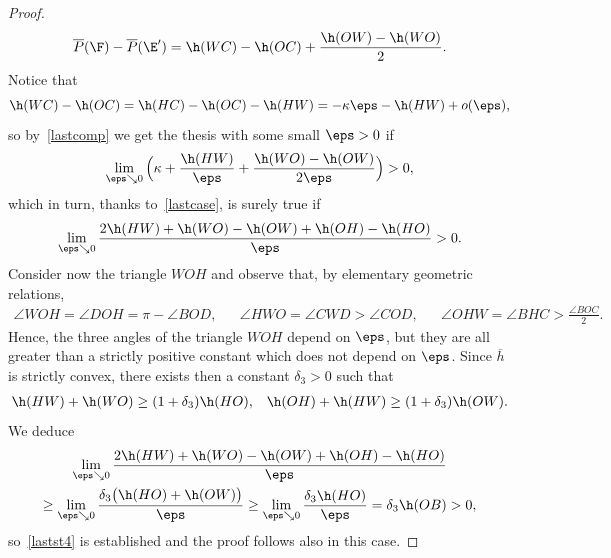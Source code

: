 \begin{proof}
\begin{equation}
\overline P(\F)-\overline P(\E')= \h(WC)-\h(OC) + \frac{\h(OW)-\h(WO)}2.
\end{equation}
Notice that
\[
\h(WC)-\h(OC) = \h(HC)-\h(OC)-\h(HW) = -\kappa \eps - \h(HW) +o(\eps),
\]
so by~\eqref{lastcomp} we get the thesis with some small $\eps>0$ if
\[
\lim_{\eps\searrow 0}\, \Bigl(\kappa+\frac{\h(HW)}\eps + \frac{\h(WO)-\h(OW)}{2\eps}\Bigr)>0,
\]
which in turn, thanks to~\eqref{lastcase}, is surely true if
\begin{equation}\label{lastst4}
\lim_{\eps\searrow 0} \frac{2\h(HW) + \h(WO)-\h(OW) + \h(OH)-\h(HO)}\eps>0.
\end{equation}
Consider now the triangle $WOH$ and observe that, by elementary geometric relations,
\begin{align*}
\angle WOH= \angle DOH = \pi - \angle BOD , &&
\angle HWO =\angle CWD > \angle COD , &&
\angle OHW = \angle BHC > \frac{\angle BOC}2 .
\end{align*}
Hence, the three angles of the triangle $WOH$ depend on $\eps$, but they are all greater than a strictly positive constant which does not depend on $\eps$. Since $\overline h$ is strictly convex, there exists then a constant $\delta_3>0$ such that
\begin{align*}
\h(HW)+\h(WO) \geq (1+\delta_3) \h(HO), && \h(OH)+ \h(HW)\geq (1+\delta_3)\h(OW).
\end{align*}
We deduce
\begin{multline*}
\lim_{\eps\searrow 0} \frac{2\h(HW) + \h(WO)-\h(OW) + \h(OH)-\h(HO)}\eps\\
\geq \lim_{\eps\searrow 0} \frac{\delta_3\big(\h(HO)+\h(OW) \big)}\eps
\geq \lim_{\eps\searrow 0} \frac{\delta_3\h(HO)}\eps
=\delta_3\h(OB)>0,
\end{multline*}
so~\eqref{lastst4} is established and the proof follows also in this case.


\end{proof}
